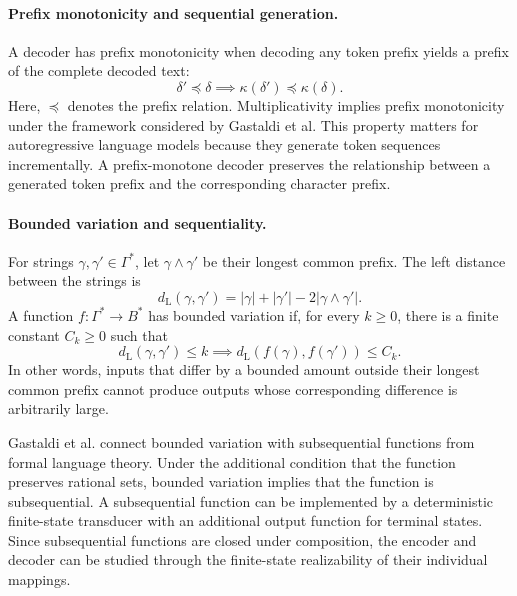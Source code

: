 \paragraph{Prefix monotonicity and sequential generation.}
A decoder has prefix monotonicity when decoding any token prefix yields a prefix of the complete decoded text:
\begin{equation}
    \delta'\preceq\delta
    \implies
    \kappa(\delta')\preceq\kappa(\delta).
    \label{eq:tokenizer-prefix-monotonicity}
\end{equation}
Here, \(\preceq\) denotes the prefix relation. Multiplicativity implies prefix monotonicity under the framework considered by Gastaldi et al. This property matters for autoregressive language models because they generate token sequences incrementally. A prefix-monotone decoder preserves the relationship between a generated token prefix and the corresponding character prefix.

\paragraph{Bounded variation and sequentiality.}
For strings \(\gamma,\gamma'\in\Gamma^*\), let \(\gamma\wedge\gamma'\) be their longest common prefix. The left distance between the strings is
\begin{equation}
    d_{\mathrm{L}}(\gamma,\gamma')
    =
    |\gamma|+|\gamma'|-2|\gamma\wedge\gamma'|.
    \label{eq:tokenizer-left-distance}
\end{equation}
A function \(f:\Gamma^*\to B^*\) has bounded variation if, for every \(k\geq0\), there is a finite constant \(C_k\geq0\) such that
\begin{equation}
    d_{\mathrm{L}}(\gamma,\gamma')\leq k
    \implies
    d_{\mathrm{L}}(f(\gamma),f(\gamma'))\leq C_k.
    \label{eq:tokenizer-bounded-variation}
\end{equation}
In other words, inputs that differ by a bounded amount outside their longest common prefix cannot produce outputs whose corresponding difference is arbitrarily large.

Gastaldi et al. connect bounded variation with subsequential functions from formal language theory. Under the additional condition that the function preserves rational sets, bounded variation implies that the function is subsequential. A subsequential function can be implemented by a deterministic finite-state transducer with an additional output function for terminal states. Since subsequential functions are closed under composition, the encoder and decoder can be studied through the finite-state realizability of their individual mappings.

